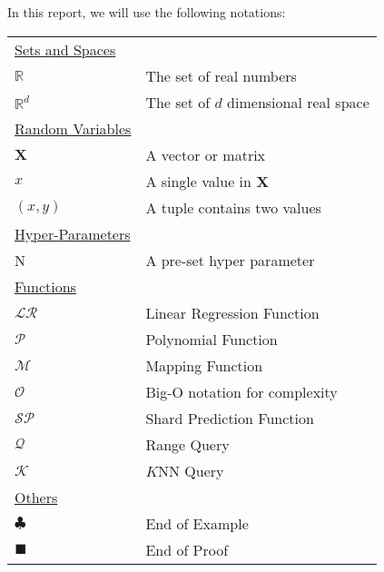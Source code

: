 In this report, we will use the following notations:

\begin{table}[h]
\begin{tabularx}{\textwidth}{@{}XX@{}}
\toprule
  \underline{Sets and Spaces} \\
  $\mathbb{R}$ & The set of real numbers \\
  $\mathbb{R}^d$ & The set of $d$ dimensional real space \\
  \underline{Random Variables} \\
  $\boldsymbol{X}$ & A vector or matrix \\
  $x$ & A single value in $\textbf{X}$ \\
  $(x,y)$ & A tuple contains two values \\	
  \underline{Hyper-Parameters} \\
  N   & A pre-set hyper parameter \\
  \underline{Functions} \\
  $\mathcal{LR}$ & Linear Regression Function\\
  $\mathcal{P}$ & Polynomial Function\\
  $\mathcal{M}$ & Mapping Function\\
  $\mathcal{O}$ & Big-O notation for complexity\\
  $\mathcal{SP}$ & Shard Prediction Function\\
  $\mathcal{Q}$ & Range Query \\
  $\mathcal{K}$ & $K$NN Query \\
  \underline{Others} \\
  $\clubsuit$ & End of Example \\
  $\blacksquare$ & End of Proof \\
\bottomrule
\end{tabularx}
\end{table}
